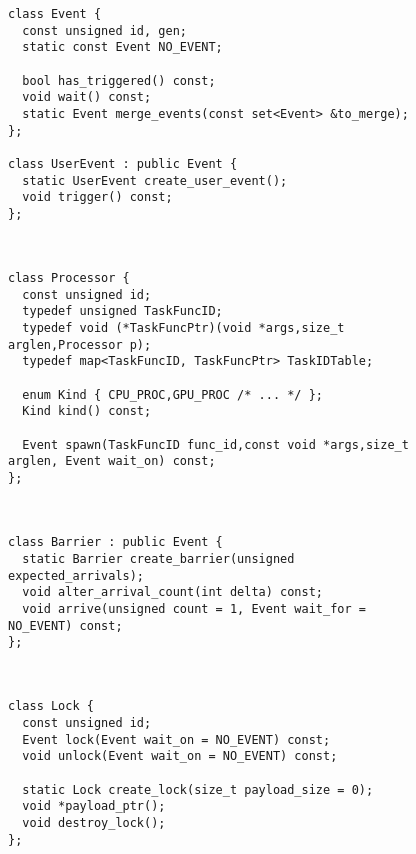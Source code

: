 \begin{figure}
\begin{lrbox}{\mylistingbox}
\begin{lstlisting}
class Event {
  const unsigned id, gen;
  static const Event NO_EVENT;

  bool has_triggered() const;
  void wait() const;
  static Event merge_events(const set<Event> &to_merge);
};

class UserEvent : public Event {
  static UserEvent create_user_event();
  void trigger() const;
};
\end{lstlisting}
\end{lrbox}
\subfigure{\usebox{\mylistingbox}} \\

\begin{lrbox}{\mylistingbox}
\begin{lstlisting}[firstnumber=14]
class Processor {
  const unsigned id;
  typedef unsigned TaskFuncID;
  typedef void (*TaskFuncPtr)(void *args,size_t arglen,Processor p);
  typedef map<TaskFuncID, TaskFuncPtr> TaskIDTable;

  enum Kind { CPU_PROC,GPU_PROC /* ... */ };
  Kind kind() const;

  Event spawn(TaskFuncID func_id,const void *args,size_t arglen, Event wait_on) const;
};
\end{lstlisting}
\end{lrbox}
\subfigure{\usebox{\mylistingbox}} \\

\begin{lrbox}{\mylistingbox}
\begin{lstlisting}[firstnumber=25]
class Barrier : public Event {
  static Barrier create_barrier(unsigned expected_arrivals);
  void alter_arrival_count(int delta) const;
  void arrive(unsigned count = 1, Event wait_for = NO_EVENT) const;
};
\end{lstlisting}
\end{lrbox}
\subfigure{\usebox{\mylistingbox}} \\

\begin{lrbox}{\mylistingbox}
\begin{lstlisting}[firstnumber=30]
class Lock {
  const unsigned id;
  Event lock(Event wait_on = NO_EVENT) const;
  void unlock(Event wait_on = NO_EVENT) const;

  static Lock create_lock(size_t payload_size = 0);
  void *payload_ptr();
  void destroy_lock();
};
\end{lstlisting}
\end{lrbox}
\subfigure{\usebox{\mylistingbox}} \\


\end{figure}
